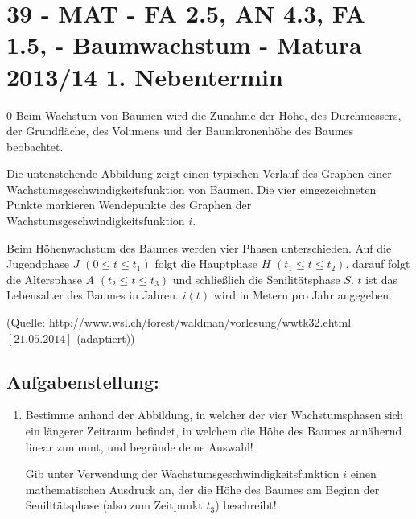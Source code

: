 \section{39 - MAT - FA 2.5, AN 4.3, FA 1.5,  - Baumwachstum - Matura 2013/14 1. Nebentermin}

\begin{langesbeispiel} \item[0] %
				Beim Wachstum von Bäumen wird die Zunahme der Höhe, des Durchmessers, der Grundfläche, des Volumens und der Baumkronenhöhe des Baumes beobachtet. 
				
				Die untenstehende Abbildung zeigt einen typischen Verlauf des Graphen einer Wachstumsgeschwindigkeitsfunktion von Bäumen. Die vier eingezeichneten Punkte markieren Wendepunkte des Graphen der Wachstumsgeschwindigkeitsfunktion $i$. 
				
				Beim Höhenwachstum des Baumes werden vier Phasen unterschieden. Auf die Jugendphase $J\,\,(0\leq t \leq t_1)$ folgt die Hauptphase $H\,\,(t_1\leq t\leq t_2)$, darauf folgt die Altersphase $A\,\,(t_2\leq t\leq t_3)$ und schließlich die Senilitätsphase $S$. $t$ ist das Lebensalter des Baumes in Jahren. $i(t)$ wird in Metern pro Jahr angegeben.

				\begin{center}\end{center}
				
				\begin{singlespace}
\begin{tiny}
(Quelle: http://www.wsl.ch/forest/waldman/vorlesung/ww\textunderscore tk32.ehtml $[21.05.2014]$ (adaptiert)) 
\end{tiny}
\end{singlespace}


\subsection{Aufgabenstellung:}
\begin{enumerate}
	\item Bestimme anhand der Abbildung, in welcher der vier Wachstumsphasen sich ein längerer Zeitraum befindet, in welchem die Höhe des Baumes annähernd linear zunimmt, und begründe deine Auswahl!
	
	Gib unter Verwendung der Wachstumsgeschwindigkeitsfunktion $i$ einen mathematischen Ausdruck an, der die Höhe des Baumes am Beginn der Senilitätsphase (also zum Zeitpunkt $t_3$) beschreibt!
					

\end{enumerate}
\end{langesbeispiel}
